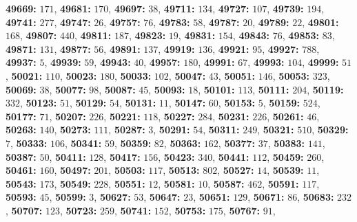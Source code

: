 \textsf{\bfseries 49669:} $171$, \textsf{\bfseries 49681:} $170$, \textsf{\bfseries 49697:} $38$, \textsf{\bfseries 49711:} $134$, \textsf{\bfseries 49727:} $107$, \textsf{\bfseries 49739:} $194$, \textsf{\bfseries 49741:} $277$, \textsf{\bfseries 49747:} $26$, \textsf{\bfseries 49757:} $76$, \textsf{\bfseries 49783:} $58$, \textsf{\bfseries 49787:} $20$, \textsf{\bfseries 49789:} $22$, \textsf{\bfseries 49801:} $168$, \textsf{\bfseries 49807:} $440$, \textsf{\bfseries 49811:} $187$, \textsf{\bfseries 49823:} $19$, \textsf{\bfseries 49831:} $154$, \textsf{\bfseries 49843:} $76$, \textsf{\bfseries 49853:} $83$, \textsf{\bfseries 49871:} $131$, \textsf{\bfseries 49877:} $56$, \textsf{\bfseries 49891:} $137$, \textsf{\bfseries 49919:} $136$, \textsf{\bfseries 49921:} $95$, \textsf{\bfseries 49927:} $788$, \textsf{\bfseries 49937:} $5$, \textsf{\bfseries 49939:} $59$, \textsf{\bfseries 49943:} $40$, \textsf{\bfseries 49957:} $180$, \textsf{\bfseries 49991:} $67$, \textsf{\bfseries 49993:} $104$, \textsf{\bfseries 49999:} $51$, \textsf{\bfseries 50021:} $110$, \textsf{\bfseries 50023:} $180$, \textsf{\bfseries 50033:} $102$, \textsf{\bfseries 50047:} $43$, \textsf{\bfseries 50051:} $146$, \textsf{\bfseries 50053:} $323$, \textsf{\bfseries 50069:} $38$, \textsf{\bfseries 50077:} $98$, \textsf{\bfseries 50087:} $45$, \textsf{\bfseries 50093:} $18$, \textsf{\bfseries 50101:} $113$, \textsf{\bfseries 50111:} $204$, \textsf{\bfseries 50119:} $332$, \textsf{\bfseries 50123:} $51$, \textsf{\bfseries 50129:} $54$, \textsf{\bfseries 50131:} $11$, \textsf{\bfseries 50147:} $60$, \textsf{\bfseries 50153:} $5$, \textsf{\bfseries 50159:} $524$, \textsf{\bfseries 50177:} $71$, \textsf{\bfseries 50207:} $226$, \textsf{\bfseries 50221:} $118$, \textsf{\bfseries 50227:} $284$, \textsf{\bfseries 50231:} $226$, \textsf{\bfseries 50261:} $46$, \textsf{\bfseries 50263:} $140$, \textsf{\bfseries 50273:} $111$, \textsf{\bfseries 50287:} $3$, \textsf{\bfseries 50291:} $54$, \textsf{\bfseries 50311:} $249$, \textsf{\bfseries 50321:} $510$, \textsf{\bfseries 50329:} $7$, \textsf{\bfseries 50333:} $106$, \textsf{\bfseries 50341:} $59$, \textsf{\bfseries 50359:} $82$, \textsf{\bfseries 50363:} $162$, \textsf{\bfseries 50377:} $37$, \textsf{\bfseries 50383:} $141$, \textsf{\bfseries 50387:} $50$, \textsf{\bfseries 50411:} $128$, \textsf{\bfseries 50417:} $156$, \textsf{\bfseries 50423:} $340$, \textsf{\bfseries 50441:} $112$, \textsf{\bfseries 50459:} $260$, \textsf{\bfseries 50461:} $160$, \textsf{\bfseries 50497:} $201$, \textsf{\bfseries 50503:} $117$, \textsf{\bfseries 50513:} $802$, \textsf{\bfseries 50527:} $14$, \textsf{\bfseries 50539:} $11$, \textsf{\bfseries 50543:} $173$, \textsf{\bfseries 50549:} $228$, \textsf{\bfseries 50551:} $12$, \textsf{\bfseries 50581:} $10$, \textsf{\bfseries 50587:} $462$, \textsf{\bfseries 50591:} $117$, \textsf{\bfseries 50593:} $45$, \textsf{\bfseries 50599:} $3$, \textsf{\bfseries 50627:} $53$, \textsf{\bfseries 50647:} $23$, \textsf{\bfseries 50651:} $129$, \textsf{\bfseries 50671:} $86$, \textsf{\bfseries 50683:} $232$, \textsf{\bfseries 50707:} $123$, \textsf{\bfseries 50723:} $259$, \textsf{\bfseries 50741:} $152$, \textsf{\bfseries 50753:} $175$, \textsf{\bfseries 50767:} $91$, 
